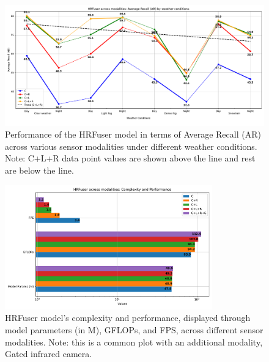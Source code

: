 \documentclass[report.tex]{subfiles}
\begin{document}
    \begin{figure}[]
        \centering
        \includegraphics[width=1.0\textwidth]{images/results/hrfuser/ar.pdf}
        \caption{Performance of the HRFuser model in terms of Average Recall (AR) across various sensor modalities under different weather conditions. Note: C+L+R data point values are shown above the line and rest are below the line.}
        \label{fig:hrfuser_ar}
    \end{figure}

    \begin{figure}[h!]
        \centering
        \includegraphics[width=0.8\textwidth]{images/results/hrfuser/model_complexity.pdf}
        \caption{HRFuser model's complexity and performance, displayed through model parameters (in M), GFLOPs, and FPS, across different sensor modalities. Note: this is a common plot with an additional modality, Gated infrared camera.}
        \label{fig:hrfuser_model_complexity}
    \end{figure}
\end{document}
